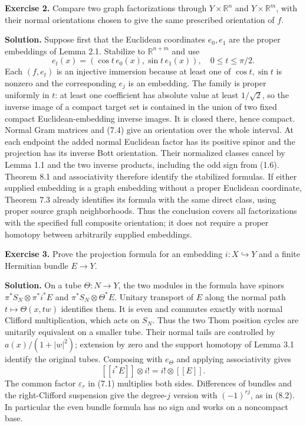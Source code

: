 \documentclass[
  11pt,
]{article}
\begin{document}
\textbf{Exercise 2.} Compare two graph factorizations through
\(Y\times\mathbb R^n\) and \(Y\times\mathbb R^m\), with their normal
orientations chosen to give the same prescribed orientation of \(f\).

\textbf{Solution.} Suppose first that the Euclidean coordinates
\(e_0,e_1\) are the proper embeddings of Lemma 2.1. Stabilize to
\(\mathbb R^{n+m}\) and use \[
 e_t(x)=(\cos t\,e_0(x),\sin t\,e_1(x)),\quad
 0\leq t\leq\pi/2.
 \tag{10.2}
\] Each \((f,e_t)\) is an injective immersion because at least one of
\(\cos t,\sin t\) is nonzero and the corresponding \(e_j\) is an
embedding. The family is proper uniformly in \(t\): at least one
coefficient has absolute value at least \(1/\sqrt2\), so the inverse
image of a compact target set is contained in the union of two fixed
compact Euclidean-embedding inverse images. It is closed there, hence
compact. Normal Gram matrices and (7.4) give an orientation over the
whole interval. At each endpoint the added normal Euclidean factor has
its positive spinor and the projection has its inverse Bott orientation.
Their normalized classes cancel by Lemma 1.1 and the two inverse
products, including the odd sign from (1.6). Theorem 8.1 and
associativity therefore identify the stabilized formulas. If either
supplied embedding is a graph embedding without a proper Euclidean
coordinate, Theorem 7.3 already identifies its formula with the same
direct class, using proper source graph neighborhoods. Thus the
conclusion covers all factorizations with the specified full composite
orientation; it does not require a proper homotopy between arbitrarily
supplied embeddings.

\textbf{Exercise 3.} Prove the projection formula for an embedding
\(i:X\hookrightarrow Y\) and a finite Hermitian bundle \(E\to Y\).

\textbf{Solution.} On a tube \(\Theta:N\to Y\), the two modules in the
formula have spinors \(\pi^*S_N\otimes\pi^*i^*E\) and
\(\pi^*S_N\otimes\Theta^*E\). Unitary transport of \(E\) along the
normal path \(t\mapsto\Theta(x,tw)\) identifies them. It is even and
commutes exactly with normal Clifford multiplication, which acts on
\(S_N\). Thus the two Thom position cycles are unitarily equivalent on a
smaller tube. Their normal tails are controlled by \(a(x)/(1+|w|^2)\);
extension by zero and the support homotopy of Lemma 3.1 identify the
original tubes. Composing with \(e_\Theta\) and applying associativity
gives \[
 [[i^*E]]\otimes i!=i!\otimes[[E]].
\] The common factor \(\varepsilon_r\) in (7.1) multiplies both sides.
Differences of bundles and the right-Clifford suspension give the
degree-\(j\) version with \((-1)^{rj}\), as in (8.2). In particular the
even bundle formula has no sign and works on a noncompact base.
\end{document}
